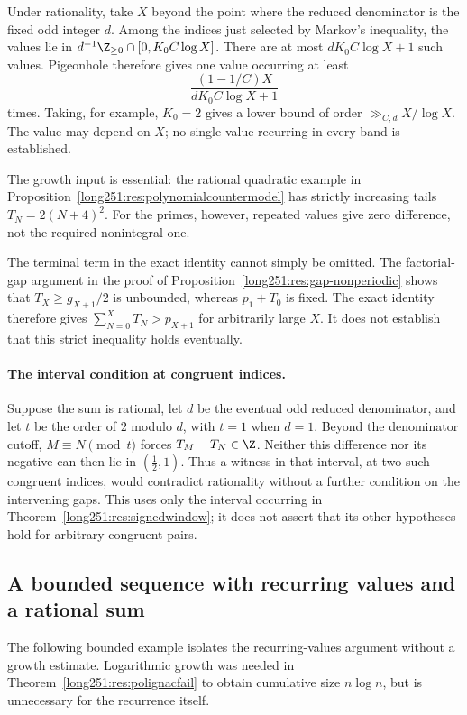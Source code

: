 Under rationality, take $X$ beyond the point where the reduced denominator
is the fixed odd integer $d$.  Among the indices just selected by Markov's
inequality, the values lie in $d^{-1}\Z_{\ge0}\cap[0,K_0C\log X]$.
There are at most $dK_0C\log X+1$ such values.  Pigeonhole therefore gives
one value occurring at least
\[
 \frac{(1-1/C)X}{dK_0C\log X+1}
\]
times.  Taking, for example, $K_0=2$ gives a lower bound of order
$\gg_{C,d}X/\log X$.  The value may depend on $X$; no single value
recurring in every band is established.

The growth input is essential: the rational quadratic example in
Proposition~\ref{long251:res:polynomialcountermodel} has strictly increasing
tails $T_N=2(N+4)^2$.  For the primes, however, repeated values give
zero difference, not the required nonintegral one.

The terminal term in the exact identity cannot simply be omitted.  The factorial-gap argument in the proof of
Proposition~\ref{long251:res:gap-nonperiodic} shows that
$T_X\ge g_{X+1}/2$ is unbounded, whereas $p_1+T_0$ is fixed.
The exact identity therefore gives
$\sum_{N=0}^{X}T_N>p_{X+1}$ for arbitrarily large $X$.
It does not establish that this strict inequality holds eventually.

\paragraph{The interval condition at congruent indices.}
Suppose the sum is rational, let $d$ be the eventual odd reduced
denominator, and let $t$ be the order of $2$ modulo $d$, with $t=1$ when
$d=1$.  Beyond the denominator cutoff, $M\equiv N\pmod t$ forces
$T_M-T_N\in\Z$.  Neither this difference nor its negative can then lie in
$(\tfrac12,1)$.  Thus a witness in that interval, at two such congruent
indices, would contradict rationality without a further condition on
the intervening gaps.  This uses only the interval occurring in
Theorem~\ref{long251:res:signedwindow}; it does not assert that its other
hypotheses hold for arbitrary congruent pairs.

\subsection{A bounded sequence with recurring values and a rational sum}
\label{long251:sec:xr-boundedpolignac}

The following bounded example isolates the recurring-values argument
without a growth estimate.  Logarithmic growth was needed in
Theorem~\ref{long251:res:polignacfail} to obtain cumulative size
$n\log n$, but is unnecessary for the recurrence itself.

